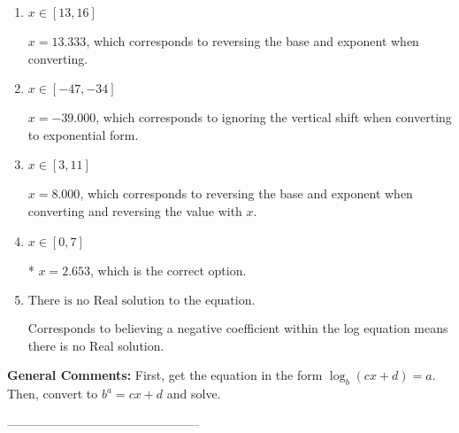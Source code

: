 \documentclass{extbook}[14pt]
\begin{document}
\begin{enumerate}[label=\Alph*.] 
\item $ x \in [13, 16] $ 

 $x = 13.333$, which corresponds to reversing the base and exponent when converting. 
\item $ x \in [-47, -34] $ 

 $x = -39.000$, which corresponds to ignoring the vertical shift when converting to exponential form. 
\item $ x \in [3, 11] $ 

 $x = 8.000$, which corresponds to reversing the base and exponent when converting and reversing the value with $x$. 
\item $ x \in [0, 7] $ 

 * $x = 2.653$, which is the correct option. 
\item $ \text{There is no Real solution to the equation.} $ 

 Corresponds to believing a negative coefficient within the log equation means there is no Real solution. 
\end{enumerate} 
 
\textbf{General Comments:} First, get the equation in the form $\log_b{(cx+d)} = a$. Then, convert to $b^a = cx+d$ and solve.

-----------------------------------------------
\end{document}
